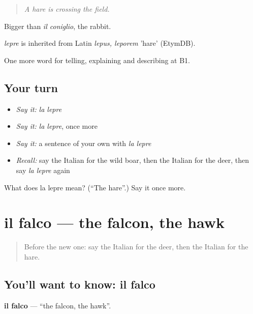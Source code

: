 \begin{quote}
\emph{A hare is crossing the field.}
\end{quote}

Bigger than \emph{il coniglio}, the rabbit.

\begin{cousinweb}
\emph{lepre} is inherited from Latin \emph{lepus, leporem} 'hare' (EtymDB).
\end{cousinweb}

\begin{grammarlens}[title={What you've built}]
One more word for telling, explaining and describing at B1.
\end{grammarlens}

\subsection*{Your turn}
\begin{itemize}
\raggedright
  \item \emph{Say it:} \emph{la lepre}
  \item \emph{Say it:} \emph{la lepre}, once more
  \item \emph{Say it:} a sentence of your own with \emph{la lepre}
  \item \emph{Recall:} say the Italian for the wild boar, then the Italian for the deer, then say \emph{la lepre} again
\end{itemize}

\begin{tcolorbox}[breakable,colback=teal!4,colframe=teal!35!black,title={Before you move on}]
What does la lepre mean? (\textquotedblleft{}The hare\textquotedblright{}.) Say it once more.
\end{tcolorbox}
\section[il falco]{il falco — the falcon, the hawk}

\label{lesson:IT-C464-falco}



\begin{quote}
Before the new one: say the Italian for the deer, then the Italian for the hare.
\end{quote}

\subsection*{You'll want to know: il falco}
\textbf{il falco} — \textquotedblleft{}the falcon, the hawk\textquotedblright{}.

